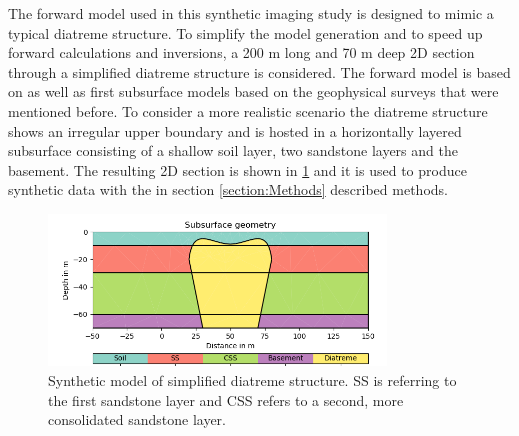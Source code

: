 The forward model used in this synthetic imaging study is designed to mimic a typical diatreme structure. To simplify the model generation and to speed up forward calculations and inversions, a 200 m long and 70 m deep 2D section through a simplified diatreme structure is considered. The forward model is based on \citet{white2011maar} as well as first subsurface models based on the geophysical surveys that were mentioned before. To consider a more realistic scenario the diatreme structure shows an irregular upper boundary and is hosted in a horizontally layered subsurface consisting of a shallow soil layer, two sandstone layers and the basement. The resulting 2D section is shown in \ref{figure:synthetic_model} and it is used to produce synthetic data with the in section \ref{section:Methods} described methods.

\begin{figure}[]
  \centering
    \includegraphics[width=0.8\textwidth]{Figures/Model.png}
    \caption[Synthetic model of simplified diatreme structure]{Synthetic model of simplified diatreme structure. SS is referring to the first sandstone layer and CSS refers to a second, more consolidated sandstone layer.}
    \label{figure:synthetic_model}
\end{figure}